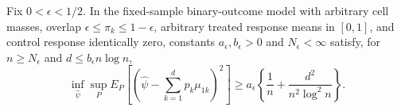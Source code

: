 Fix \(0<\epsilon<1/2\).  In the fixed-sample binary-outcome model with arbitrary cell masses, overlap \(\epsilon\le\pi_k\le1-\epsilon\), arbitrary treated response means in \([0,1]\), and control response identically zero, constants \(a_{\epsilon},b_{\epsilon}>0\) and \(N_{\epsilon}<\infty\) satisfy, for \(n\ge N_{\epsilon}\) and \(d\le b_{\epsilon}n\log n\),
\[
 \inf_{\widehat\psi}\sup_P E_P[(\widehat\psi-\sum_{k=1}^dp_k\mu_{1k})^2]
 \ge a_{\epsilon}\left\{\frac1n+\frac{d^2}{n^2\log^2 n}\right\}.
\]